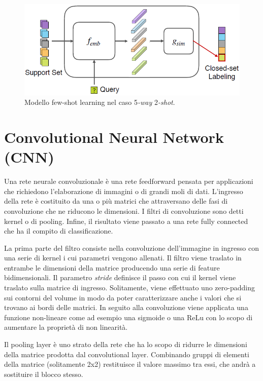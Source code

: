 \documentclass[12pt,a4paper,titlepage]{article}
\begin{document}
\begin{figure}[h]
	\centering	
	\includegraphics[width=.5\textwidth]{Immagini/few_shot_learning_model}
	\caption{Modello few-shot learning nel caso 5\emph{-way} 2\emph{-shot}.~\cite{Salamon:Few-Shot}}
	\label{fig:few-shot_learning_model}
\end{figure}
\clearpage

\section{Convolutional Neural Network (CNN)}
Una rete neurale convoluzionale è una rete feedforward pensata per applicazioni che richiedono l'elaborazione di immagini o di grandi moli di dati.
L'ingresso della rete è costituito da una o più matrici che attraversano delle fasi di convoluzione che ne riducono le dimensioni. I filtri di convoluzione sono detti kernel o di pooling. Infine, il risultato viene passato a una rete fully connected che ha il compito di classificazione.

La prima parte del filtro consiste nella convoluzione dell'immagine in ingresso con una serie di kernel i cui parametri vengono allenati.
Il filtro viene traslato in entrambe le dimensioni della matrice producendo una serie di feature bidimensionali.
Il parametro \textit{stride} definisce il passo con cui il kernel viene traslato sulla matrice di ingresso.
Solitamente, viene effettuato uno zero-padding sui contorni del volume in modo da poter caratterizzare anche i valori che si trovano ai bordi delle matrici.
In seguito alla convoluzione viene applicata una funzione non-lineare come ad esempio una sigmoide o una ReLu con lo scopo di aumentare la proprietà di non linearità.

Il pooling layer è uno strato della rete che ha lo scopo di ridurre le dimensioni della matrice prodotta dal convolutional layer. Combinando gruppi di elementi della matrice (solitamente 2x2) restituisce il valore massimo tra essi, che andrà a sostituire il blocco stesso.
\end{document}
